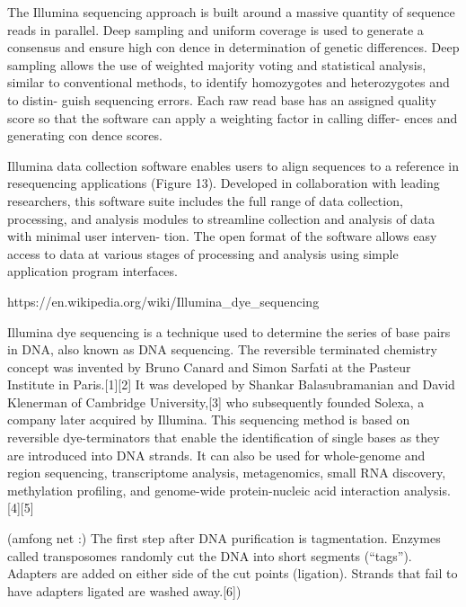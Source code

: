 The Illumina sequencing approach is built around a massive quantity of sequence reads in parallel. Deep sampling and uniform coverage is used to generate a consensus and ensure high con dence in determination of genetic differences. Deep sampling allows the use of weighted majority voting and statistical analysis, similar to conventional methods, to identify homozygotes and heterozygotes and to distin- guish sequencing errors. Each raw read base has an assigned quality score so that the software can apply a weighting factor in calling differ- ences and generating con dence scores.

Illumina data collection software enables users to align sequences to a reference in resequencing applications (Figure 13). Developed in collaboration with leading researchers, this software suite includes the full range of data collection, processing, and analysis modules to streamline collection and analysis of data with minimal user interven- tion. The open format of the software allows easy access to data at various stages of processing and analysis using simple application program interfaces.

https://en.wikipedia.org/wiki/Illumina_dye_sequencing

Illumina dye sequencing is a technique used to determine the series of base pairs in DNA, also known as DNA sequencing. The reversible terminated chemistry concept was invented by Bruno Canard and Simon Sarfati at the Pasteur Institute in Paris.[1][2] It was developed by Shankar Balasubramanian and David Klenerman of Cambridge University,[3] who subsequently founded Solexa, a company later acquired by Illumina. This sequencing method is based on reversible dye-terminators that enable the identification of single bases as they are introduced into DNA strands. It can also be used for whole-genome and region sequencing, transcriptome analysis, metagenomics, small RNA discovery, methylation profiling, and genome-wide protein-nucleic acid interaction analysis.[4][5]

(amfong net :) The first step after DNA purification is tagmentation. Enzymes called transposomes randomly cut the DNA into short segments (“tags”). Adapters are added on either side of the cut points (ligation). Strands that fail to have adapters ligated are washed away.[6])

